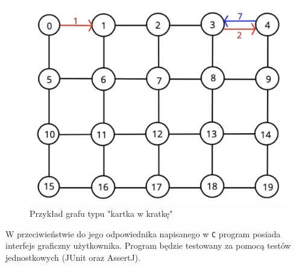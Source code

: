 \documentclass[10pt, a4paper]{report}
\begin{document}
    \begin{figure}[ht]
        \begin{center}
            \includegraphics[scale=0.15]{graph.png}
            \caption{Przykład grafu typu "kartka w kratkę"}
        \end{center}
    \end{figure}
    W przeciwieństwie do jego odpowiednika napisanego w \texttt{C} program posiada interfejs graficzny użytkownika. Program będzie testowany za pomocą testów jednostkowych (JUnit oraz AssertJ).
    \newpage
\end{document}
